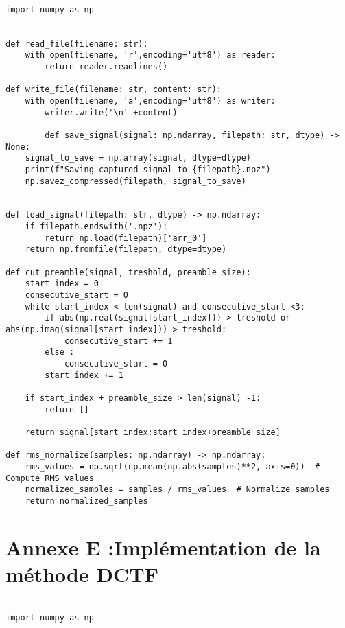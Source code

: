 \begin{lstlisting}[style=pythonstyle, caption={Preprocessing}, label={lst:python}]

import numpy as np


def read_file(filename: str):
    with open(filename, 'r',encoding='utf8') as reader:
        return reader.readlines()

def write_file(filename: str, content: str):
    with open(filename, 'a',encoding='utf8') as writer:
        writer.write('\n' +content)
        
        def save_signal(signal: np.ndarray, filepath: str, dtype) -> None:
    signal_to_save = np.array(signal, dtype=dtype)
    print(f"Saving captured signal to {filepath}.npz")
    np.savez_compressed(filepath, signal_to_save)


def load_signal(filepath: str, dtype) -> np.ndarray:
    if filepath.endswith('.npz'):
        return np.load(filepath)['arr_0']
    return np.fromfile(filepath, dtype=dtype)
    
def cut_preamble(signal, treshold, preamble_size):
    start_index = 0
    consecutive_start = 0
    while start_index < len(signal) and consecutive_start <3:
        if abs(np.real(signal[start_index])) > treshold or abs(np.imag(signal[start_index])) > treshold:
            consecutive_start += 1
        else :
            consecutive_start = 0
        start_index += 1

    if start_index + preamble_size > len(signal) -1:
        return []

    return signal[start_index:start_index+preamble_size]

def rms_normalize(samples: np.ndarray) -> np.ndarray:
    rms_values = np.sqrt(np.mean(np.abs(samples)**2, axis=0))  # Compute RMS values
    normalized_samples = samples / rms_values  # Normalize samples
    return normalized_samples
\end{lstlisting}

\newpage

\section{Annexe E :Implémentation de la méthode DCTF}\label{codedctf}


\begin{lstlisting}[style=pythonstyle, caption={Preprocessing}, label={lst:python}]

import numpy as np



\end{lstlisting}